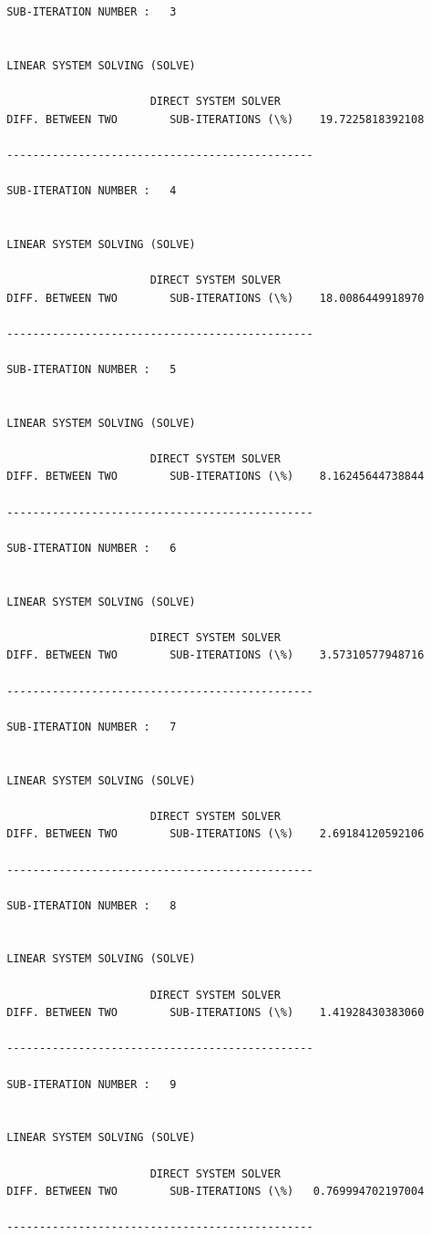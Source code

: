 \begin{verbatim}
 SUB-ITERATION NUMBER :   3


 LINEAR SYSTEM SOLVING (SOLVE)

                       DIRECT SYSTEM SOLVER
 DIFF. BETWEEN TWO        SUB-ITERATIONS (\%)    19.7225818392108

 -----------------------------------------------

 SUB-ITERATION NUMBER :   4


 LINEAR SYSTEM SOLVING (SOLVE)

                       DIRECT SYSTEM SOLVER
 DIFF. BETWEEN TWO        SUB-ITERATIONS (\%)    18.0086449918970

 -----------------------------------------------

 SUB-ITERATION NUMBER :   5


 LINEAR SYSTEM SOLVING (SOLVE)

                       DIRECT SYSTEM SOLVER
 DIFF. BETWEEN TWO        SUB-ITERATIONS (\%)    8.16245644738844

 -----------------------------------------------

 SUB-ITERATION NUMBER :   6


 LINEAR SYSTEM SOLVING (SOLVE)

                       DIRECT SYSTEM SOLVER
 DIFF. BETWEEN TWO        SUB-ITERATIONS (\%)    3.57310577948716

 -----------------------------------------------

 SUB-ITERATION NUMBER :   7


 LINEAR SYSTEM SOLVING (SOLVE)

                       DIRECT SYSTEM SOLVER
 DIFF. BETWEEN TWO        SUB-ITERATIONS (\%)    2.69184120592106

 -----------------------------------------------

 SUB-ITERATION NUMBER :   8


 LINEAR SYSTEM SOLVING (SOLVE)

                       DIRECT SYSTEM SOLVER
 DIFF. BETWEEN TWO        SUB-ITERATIONS (\%)    1.41928430383060

 -----------------------------------------------

 SUB-ITERATION NUMBER :   9


 LINEAR SYSTEM SOLVING (SOLVE)

                       DIRECT SYSTEM SOLVER
 DIFF. BETWEEN TWO        SUB-ITERATIONS (\%)   0.769994702197004

 -----------------------------------------------


\end{verbatim}
